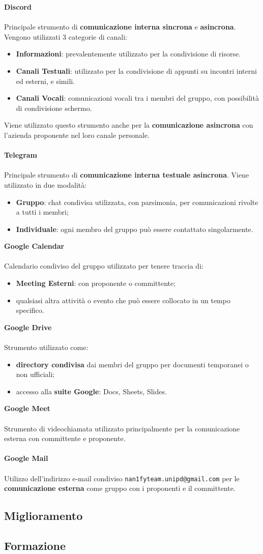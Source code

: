 \textbf{Discord}\\\\
Principale strumento di \textbf{comunicazione interna sincrona} e \textbf{asincrona}. Vengono utilizzati 3 categorie di canali:
\begin{itemize}
  \item \textbf{Informazioni}: prevalentemente utilizzato per la condivisione di risorse.
  \item \textbf{Canali Testuali}: utilizzato per la condivisione di appunti su incontri interni ed esterni, e simili.
  \item \textbf{Canali Vocali}: comunicazioni vocali tra i membri del gruppo, con possibilità di condivisione schermo.
\end{itemize}
\medskip
Viene utilizzato questo strumento anche per la \textbf{comunicazione asincrona} con l'azienda proponente nel loro canale personale.
\\\\
\textbf{Telegram}\\\\
Principale strumento di \textbf{comunicazione interna testuale asincrona}. Viene utilizzato in due modalità:
\begin{itemize}
  \item \textbf{Gruppo}: chat condivisa utilizzata, con parsimonia, per comunicazioni rivolte a tutti i membri;
  \item \textbf{Individuale}: ogni membro del gruppo può essere contattato singolarmente.
\end{itemize}
\medskip
\textbf{Google Calendar}\\\\
Calendario condiviso del gruppo utilizzato per tenere traccia di:
\begin{itemize}
  \item \textbf{Meeting Esterni}: con proponente o committente;
  \item qualsiasi altra attività o evento che può essere collocato in un tempo specifico.
\end{itemize}
\medskip
\textbf{Google Drive}\\\\
Strumento utilizzato come:
\begin{itemize}
  \item \textbf{directory condivisa} dai membri del gruppo per documenti temporanei o non ufficiali;
  \item accesso alla \textbf{suite Google}: Docs, Sheets, Slides.
\end{itemize}
\medskip
\textbf{Google Meet}\\\\
Strumento di videochiamata utilizzato principalmente per la comunicazione esterna con committente e proponente.
\\\\
\textbf{Google Mail}\\\\
Utilizzo dell'indirizzo e-mail condiviso \texttt{nan1fyteam.unipd@gmail.com} per le \textbf{comunicazione esterna} come gruppo con i proponenti e il committente.

\subsection{Miglioramento}
\subsection{Formazione}